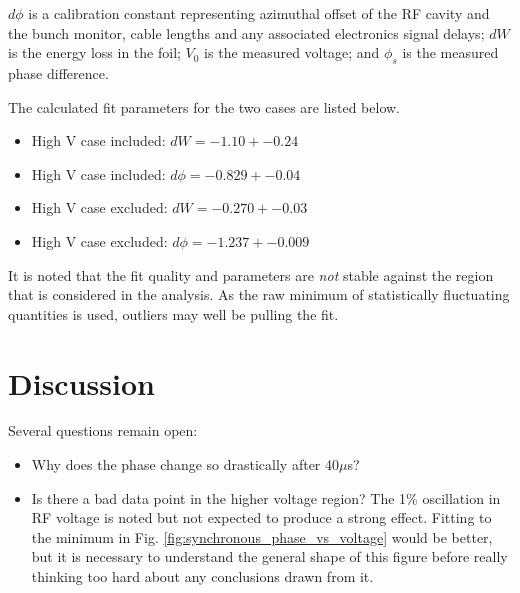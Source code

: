 \documentclass{paper}
\begin{document}
$d\phi$ is a calibration constant representing azimuthal offset of the RF
cavity and the bunch monitor, cable lengths and any associated electronics 
signal delays; $dW$ is the energy loss in the foil; $V_0$ is the measured 
voltage; and $\phi_s$ is the measured phase difference.

The calculated fit parameters for the two cases are listed below.
\begin{itemize}
\item High V case included: $dW = -1.10 +- 0.24$
\item High V case included: $d\phi = -0.829 +-   0.04 $    
\item High V case excluded: $dW = -0.270 +- 0.03 $
\item High V case excluded: $d\phi = -1.237 +-   0.009$    
\end{itemize}

It is noted that the fit quality and parameters are \emph{not} stable against
the region that is considered in the analysis. As the raw minimum of 
statistically fluctuating quantities is used, outliers may well be pulling the 
fit.

\section{Discussion}
Several questions remain open:
\begin{itemize}
\item Why does the phase change so drastically after 40$\mu$s?
\item Is there a bad data point in the higher voltage region? The 1$\%$ 
oscillation in RF voltage is noted but not expected to produce a strong effect.
Fitting to the minimum in Fig. \ref{fig:synchronous_phase_vs_voltage} would
be better, but it is necessary to understand the general shape of this figure
before really thinking too hard about any conclusions drawn from it.
\end{itemize}
\end{document}
